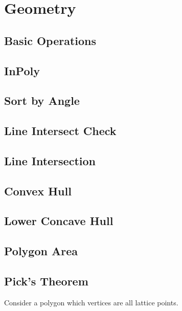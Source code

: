 \documentclass[a4paper,10pt,twocolumn,oneside]{article}
\begin{document}
\section{Geometry}

\subsection{Basic Operations}


\subsection{InPoly}


\subsection{Sort by Angle}


\subsection{Line Intersect Check}


\subsection{Line Intersection}


\subsection{Convex Hull}


\subsection{Lower Concave Hull}


\subsection{Polygon Area}


\subsection{Pick's Theorem}
Consider a polygon which vertices are all lattice points.
\end{document}
